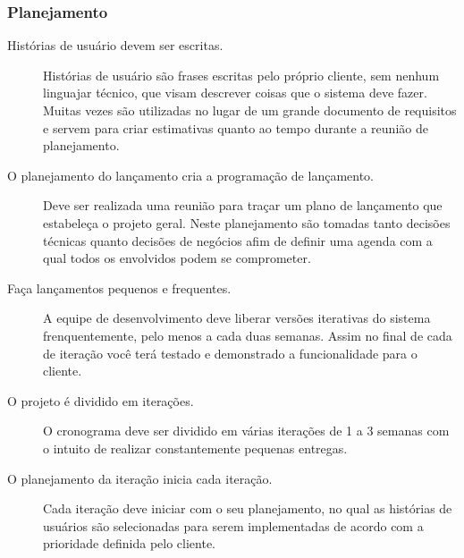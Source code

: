 \subsubsection{Planejamento}
\begin{description}
    \item[Histórias de usuário devem ser escritas.] Histórias de usuário são frases escritas
    pelo próprio cliente, sem nenhum linguajar técnico, que visam descrever coisas que o
    sistema deve fazer. Muitas vezes são utilizadas no lugar de um grande documento de
    requisitos e servem para criar estimativas quanto ao tempo durante a reunião de
    planejamento.
    \item[O planejamento do lançamento cria a programação de lançamento.] Deve ser realizada
    uma reunião para traçar um plano de lançamento que estabeleça o projeto geral. Neste
    planejamento são tomadas tanto decisões técnicas quanto decisões de negócios afim de
    definir uma agenda com a qual todos os envolvidos podem se comprometer.
    \item[Faça lançamentos pequenos e frequentes.] A equipe de desenvolvimento deve
    liberar versões iterativas do sistema frenquentemente, pelo menos a cada duas semanas.
    Assim no final de cada de iteração você terá testado e demonstrado a funcionalidade
    para o cliente.
    \item[O projeto é dividido em iterações.] O cronograma deve ser dividido
    em várias iterações de 1 a 3 semanas com o intuito de realizar constantemente pequenas
    entregas. 
    \item[O planejamento da iteração inicia cada iteração.] Cada iteração deve iniciar com
    o seu planejamento, no qual as histórias de usuários são selecionadas para serem
    implementadas de acordo com a prioridade definida pelo cliente.
\end{description}

